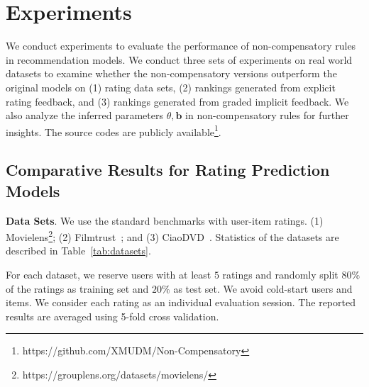 \documentclass[letterpaper]{article} %
\begin{document}
\section{Experiments}\label{sec:experiment}
We conduct experiments to evaluate the performance of non-compensatory rules in recommendation models. We conduct three sets of experiments on real world datasets to examine whether the non-compensatory versions outperform the original models on (1) rating data sets, (2) rankings generated from explicit rating feedback, and (3) rankings generated from graded implicit feedback. We also analyze the inferred parameters $\theta,\mathbf{b}$ in non-compensatory rules for further insights. The source codes are publicly available\footnote{https://github.com/XMUDM/Non-Compensatory}.

\subsection{Comparative Results for Rating Prediction Models}

\textbf{Data Sets}. We use the standard benchmarks with user-item ratings. (1) Movielens\footnote{https://grouplens.org/datasets/movielens/}; (2) Filmtrust~\cite{Guo2013Novel}; and (3) CiaoDVD~\cite{Guo2014ETAF}. Statistics of the datasets are described in Table~\ref{tab:datasets}. 

For each dataset, we reserve users with at least $5$ ratings and randomly split $80\%$ of the ratings as training set and $20\%$ as test set. We avoid cold-start users and items. We consider each rating as an individual evaluation session. The reported results are averaged using 5-fold cross validation. 
\begin{table}[htp]
\caption{Statistics of Datasets with ratings}
\centering
{}
\label{tab:datasets}
\end{table}
\end{document}
